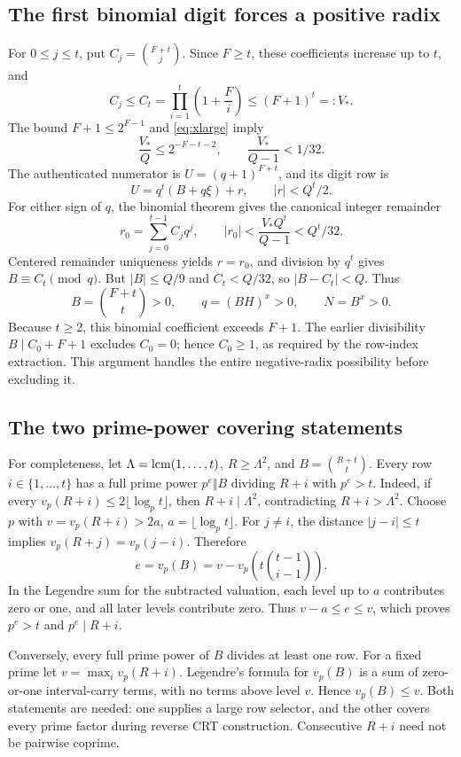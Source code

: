 \subsection{The first binomial digit forces a positive radix}

For $0\le j\le t$, put $C_j=\binom{F+t}{j}$.
Since $F\ge t$, these coefficients increase up to $t$, and
\[
 C_j\le C_t=\prod_{i=1}^t\left(1+\frac{F}{i}\right)
       \le(F+1)^t=:V_*.
\]
The bound $F+1\le2^{F-1}$ and \eqref{eq:xlarge} imply
\[
 \frac{V_*}{Q}\le2^{-F-t-2},\qquad \frac{V_*}{Q-1}<1/32.
\]
The authenticated numerator is $U=(q+1)^{F+t}$, and its digit row is
\[
 U=q^t(B+q\xi)+r,\qquad |r|<Q^t/2.
\]
For either sign of $q$, the binomial theorem gives the canonical
integer remainder
\[
 r_0=\sum_{j=0}^{t-1}C_jq^j,
 \qquad |r_0|<\frac{V_*Q^t}{Q-1}<Q^t/32.
\]
Centered remainder uniqueness yields $r=r_0$, and division by $q^t$
gives $B\equiv C_t\pmod q$. But $|B|\le Q/9$ and
$C_t<Q/32$, so $|B-C_t|<Q$. Thus
\[
 B=\binom{F+t}{t}>0,\qquad q=(BH)^x>0,\qquad N=B^x>0.
\]
Because $t\ge2$, this binomial coefficient exceeds $F+1$.
The earlier divisibility $B\mid C_0+F+1$ excludes $C_0=0$;
hence $C_0\ge1$, as required by the row-index extraction.
This argument handles the entire negative-radix possibility before
excluding it.

\subsection{The two prime-power covering statements}

For completeness, let $\Lambda=\operatorname{lcm}(1,\ldots,t)$, $R\ge\Lambda^2$,
and $B=\binom{R+t}{t}$. Every row $i\in\{1,\ldots,t\}$ has a full
prime power $p^e\Vert B$ dividing $R+i$ with $p^e>t$.
Indeed, if every $v_p(R+i)\le2\lfloor\log_p t\rfloor$, then
$R+i\mid\Lambda^2$, contradicting $R+i>\Lambda^2$.
Choose $p$ with $v=v_p(R+i)>2a$, $a=\lfloor\log_p t\rfloor$.
For $j\ne i$, the distance $|j-i|\le t$ implies
$v_p(R+j)=v_p(j-i)$. Therefore
\[
 e=v_p(B)=v-v_p\!\left(t\binom{t-1}{i-1}\right).
\]
In the Legendre sum for the subtracted valuation, each level up to $a$
contributes zero or one, and all later levels contribute zero.
Thus $v-a\le e\le v$, which proves $p^e>t$ and $p^e\mid R+i$.

Conversely, every full prime power of $B$ divides at least one row.
For a fixed prime let $v=\max_i v_p(R+i)$. Legendre's formula for
$v_p(B)$ is a sum of zero-or-one interval-carry terms, with no terms
above level $v$. Hence $v_p(B)\le v$. Both statements are needed:
one supplies a large row selector, and the other covers every prime
factor during reverse CRT construction. Consecutive $R+i$ need not
be pairwise coprime.

